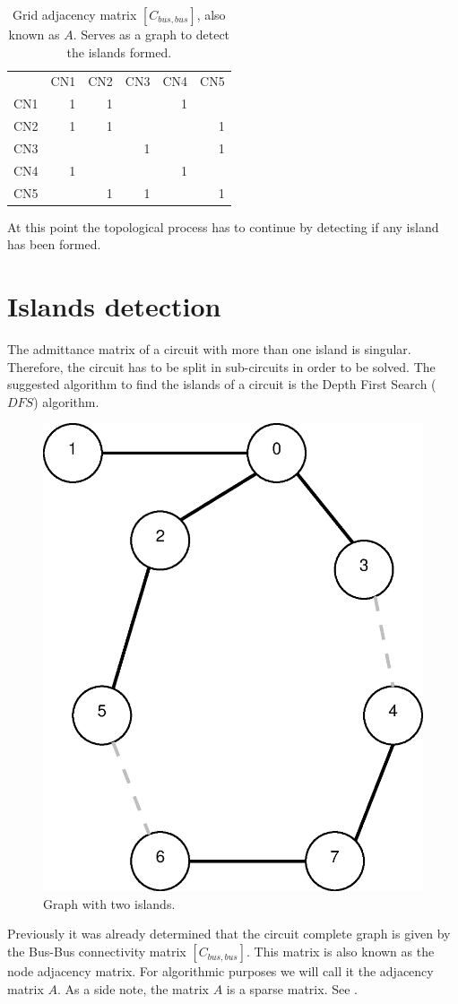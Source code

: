 \documentclass[nols,a4paper,twoside,notoc,fleqn]{tufte-book}
\begin{document}
\begin{table}[h!]
	\begin{tabular}{lrrrrr}
		{} &  CN1 &  CN2 &  CN3 &  CN4 &  CN5 \\
		CN1 &    1 &    1 &      &    1 &      \\
		CN2 &    1 &    1 &      &      &    1 \\
		CN3 &      &      &    1 &      &    1 \\
		CN4 &    1 &      &      &    1 &      \\
		CN5 &      &    1 &    1 &      &    1 \\
	\end{tabular}
	\caption{Grid adjacency matrix $[C_{bus, bus}]$, also known as $A$. Serves as a graph to detect the islands formed.}
\end{table}

\vspace{0.5cm}

At this point the topological process has to continue by detecting if any island has been formed.

\newpage
\section{Islands detection}

The admittance matrix of a circuit with more than one island is singular. Therefore, the circuit has to be split in sub-circuits in order to be solved. The suggested algorithm to find the islands of a circuit is the Depth First Search ($DFS$) algorithm.

\begin{figure}[h!]
	\centering
	\includegraphics[width=0.35\linewidth]{img/general_graph.eps}
	\caption{Graph with two islands.}
	\label{fig:general_graph}
\end{figure}


Previously it was already determined that the circuit complete graph is given by the Bus-Bus connectivity matrix $[C_{bus, bus}]$. This matrix is also known as the node adjacency matrix. For algorithmic purposes we will call it the adjacency matrix $A$. As a side note, the matrix $A$ is a sparse matrix. See \cite{CSC_matrix}.
\end{document}
